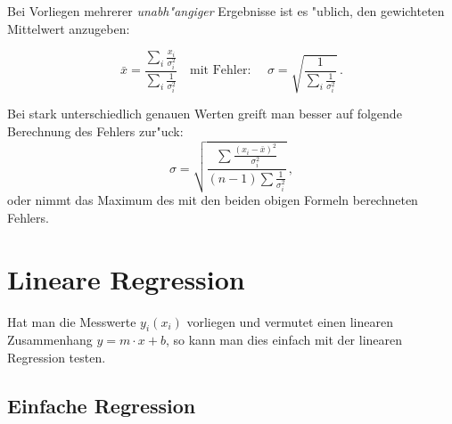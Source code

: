 Bei Vorliegen mehrerer \emph{unabh"angiger} Ergebnisse ist es "ublich,
den gewichteten Mittelwert anzugeben:
%
\begin{important}
\begin{equation}\label{e:gewmittel1}
 \bar x = \frac{
   \sum\limits_i \frac{x_i}{\sigma_i^2 }
    }{
    \sum\limits_i \frac{1}{\sigma_i^2}
    }
    \quad \mbox{mit Fehler: } \quad
    \sigma  = \sqrt{\frac{1}{\sum\limits_i \frac{1}{\sigma_i^2}} } \, .
\end{equation}
\end{important}
%
Bei stark unterschiedlich genauen Werten greift man besser auf
folgende Berechnung des Fehlers zur"uck:
%
\begin{equation}\label{e:gewsigma2}
 \sigma  = \sqrt {\frac{{\sum {\frac{{\left( {x_i  - \bar x}
 \right)^2 }}{{\sigma _i^2 }}} }}{{\left( {n - 1} \right)\sum
 {\frac{1}{{\sigma _i^2 }}} }}} \, ,
\end{equation}
%
oder nimmt das Maximum des mit den beiden obigen Formeln
berechneten Fehlers.

\section{Lineare Regression}

Hat man die Messwerte $y_i(x_i)$ vorliegen und vermutet einen
linearen Zusammenhang $y=m\cdot x + b$, so kann man dies einfach
mit der linearen Regression testen. 

\subsection{Einfache Regression}

